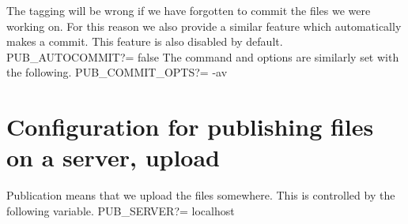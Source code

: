 The tagging will be wrong if we have forgotten to commit the files we were 
working on.
For this reason we also provide a similar feature which automatically makes 
a commit.
This feature is also disabled by default.
\nwenddocs{}\plusendmoddef\nwstartdeflinemarkup{}\nwenddeflinemarkup
PUB_AUTOCOMMIT?=    false
\nwendcode{}The command and options are similarly set with the following.
\nwenddocs{}\plusendmoddef\nwstartdeflinemarkup{}\nwenddeflinemarkup
PUB_COMMIT_OPTS?=   -av
\nwendcode{}\nwdocspar


\section{Configuration for publishing files on a server, {\Tt{}upload\nwendquote}}

Publication means that we upload the files somewhere.
This is controlled by the following variable.
\nwenddocs{}\plusendmoddef\nwstartdeflinemarkup{}\nwenddeflinemarkup
PUB_SERVER?=        localhost
\nwendcode{}\nwdocspar

